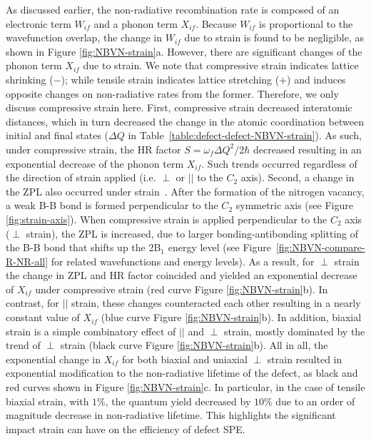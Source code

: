 As discussed earlier, the non-radiative recombination rate is composed of an electronic term $W_{if}$ and a phonon term $X_{if}$. Because $W_{if}$ is proportional to the wavefunction overlap, the change in $W_{if}$ due to strain is found to be negligible, as shown in Figure \ref{fig:NBVN-strain}a.
However, there are significant changes of the phonon term $X_{if}$ due to strain.
We note that compressive strain indicates lattice shrinking ($-$); while tensile strain indicates lattice stretching ($+$) and induces opposite changes on non-radiative rates from the former. Therefore, we only discuss compressive strain here. First, compressive strain decreased interatomic distances, which in turn decreased the change in the atomic coordination between initial and final states ($\Delta Q$ in Table~\ref{table:defect-defect-NBVN-strain}). As such, under compressive strain, the HR factor $S=\omega_f\Delta Q^2/2\hbar$ decreased resulting in an exponential decrease of the phonon term $X_{if}$. Such trends occurred regardless of the direction of strain applied (i.e. $\perp$ or $||$ to the $C_2$ axis). Second, a change in the ZPL also occurred under strain~\cite{grosso2017tunable}. After the formation of the nitrogen vacancy, a weak B-B bond is formed perpendicular to the $C_2$ symmetric axis (see Figure \ref{fig:strain-axis}). When compressive strain is applied perpendicular to the $C_2$ axis ($\perp$ strain), the ZPL is increased, due to larger bonding-antibonding splitting of the B-B bond that shifts up the 2B$_1$ energy level (see Figure~\ref{fig:NBVN-compare-R-NR-all} for related wavefunctions and energy levels). As a result, for $\perp$ strain the change in ZPL and HR factor coincided and yielded an exponential decrease of $X_{if}$ under compressive strain (red curve Figure \ref{fig:NBVN-strain}b). In contrast, for $||$ strain, these changes counteracted each other resulting in a nearly constant value of $X_{if}$ (blue curve Figure \ref{fig:NBVN-strain}b). In addition, biaxial strain is a simple combinatory effect of $||$ and $\perp$ strain, mostly dominated by the trend of $\perp$ strain (black curve Figure \ref{fig:NBVN-strain}b).
All in all, the exponential change in $X_{if}$ for both biaxial and uniaxial $\perp$ strain resulted in exponential modification to the non-radiative lifetime of the defect, as black and red curves shown in Figure \ref{fig:NBVN-strain}c.
In particular, in the case of tensile biaxial strain, with $1\%$, the quantum yield decreased by $10\%$ due to an order of magnitude decrease in non-radiative lifetime. This highlights the significant impact strain can have on the efficiency of defect SPE.

